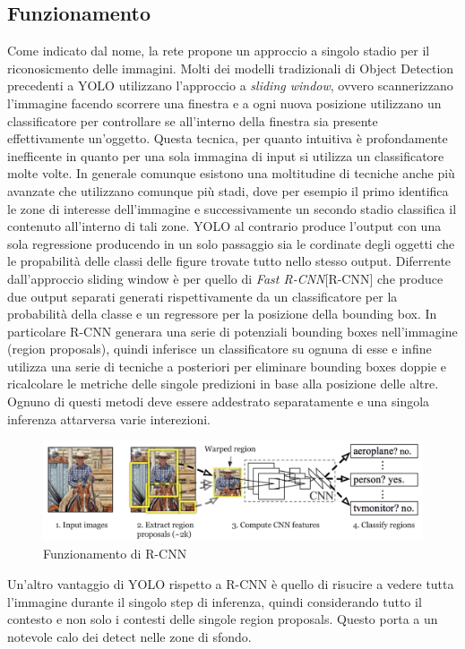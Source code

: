 \documentclass[12pt,a4paper,openright,twoside]{report}
\begin{document}
\subsection{Funzionamento}
Come indicato dal nome, la rete propone un approccio a singolo stadio per il riconosicmento delle immagini. Molti dei modelli tradizionali di Object Detection precedenti a YOLO utilizzano l'approccio a \emph{sliding window}, ovvero scannerizzano l'immagine facendo scorrere una finestra e a ogni nuova posizione utilizzano un classificatore per controllare se all'interno della finestra sia presente effettivamente un'oggetto. 
Questa tecnica, per quanto intuitiva è profondamente inefficente in quanto per una sola immagina di input si utilizza un classificatore molte volte.
In generale comunque esistono una moltitudine di tecniche anche più avanzate che utilizzano comunque più stadi, dove per esempio il primo identifica le zone di interesse dell'immagine e successivamente un secondo stadio classifica il contenuto all'interno di tali zone. 
YOLO al contrario produce l'output con una sola regressione producendo in un solo passaggio sia le cordinate degli oggetti che le propabilità delle classi delle figure trovate tutto nello stesso output.
Diferrente dall'approccio sliding window è per quello di \emph{Fast R-CNN}[R-CNN] che produce due output separati generati rispettivamente da un classificatore per la probabilità della classe e un regressore per la posizione della bounding box. In particolare R-CNN generara una serie di potenziali bounding boxes nell'immagine (region proposals), quindi inferisce un classificatore su ognuna di esse e infine utilizza una serie di tecniche a posteriori per eliminare bounding boxes doppie e ricalcolare le metriche delle singole predizioni in base alla posizione delle altre. Ognuno di questi metodi deve essere addestrato separatamente e una singola inferenza attarversa varie interezioni.
\begin{figure}[h]
\centering
\includegraphics[width=\linewidth]{RCNN.png}
\caption{Funzionamento di R-CNN}
\end{figure}
Un'altro vantaggio di YOLO rispetto a R-CNN è quello di risucire a vedere tutta l'immagine durante il singolo step di inferenza, quindi considerando tutto il contesto e non solo i contesti delle singole region proposals. Questo porta a un notevole calo dei detect nelle zone di sfondo.
\end{document}
